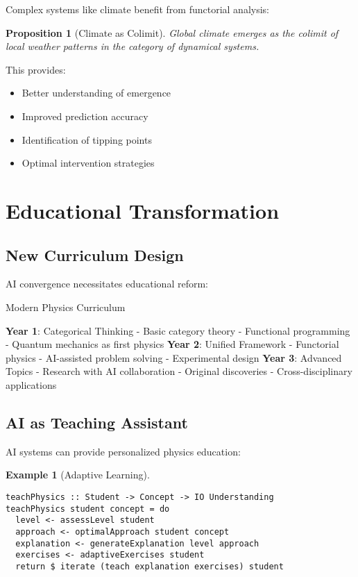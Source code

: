 \documentclass[11pt,a4paper]{article}
\newtheorem{proposition}[theorem]{Proposition}
\newtheorem{example}[theorem]{Example}
\begin{document}
Complex systems like climate benefit from functorial analysis:

\begin{proposition}[Climate as Colimit]
Global climate emerges as the colimit of local weather patterns in the category of dynamical systems.
\end{proposition}

This provides:
\begin{itemize}
    \item Better understanding of emergence
    \item Improved prediction accuracy
    \item Identification of tipping points
    \item Optimal intervention strategies
\end{itemize}

\section{Educational Transformation}

\subsection{New Curriculum Design}

AI convergence necessitates educational reform:

\begin{algorithm}
\caption{Modern Physics Curriculum}
\begin{algorithmic}[1]
\STATE \textbf{Year 1}: Categorical Thinking
\STATE \quad - Basic category theory
\STATE \quad - Functional programming
\STATE \quad - Quantum mechanics as first physics
\STATE \textbf{Year 2}: Unified Framework
\STATE \quad - Functorial physics
\STATE \quad - AI-assisted problem solving
\STATE \quad - Experimental design
\STATE \textbf{Year 3}: Advanced Topics
\STATE \quad - Research with AI collaboration
\STATE \quad - Original discoveries
\STATE \quad - Cross-disciplinary applications
\end{algorithmic}
\end{algorithm}

\subsection{AI as Teaching Assistant}

AI systems can provide personalized physics education:

\begin{example}[Adaptive Learning]
\begin{lstlisting}
teachPhysics :: Student -> Concept -> IO Understanding
teachPhysics student concept = do
  level <- assessLevel student
  approach <- optimalApproach student concept
  explanation <- generateExplanation level approach
  exercises <- adaptiveExercises student
  return $ iterate (teach explanation exercises) student
\end{lstlisting}
\end{example}
\end{document}
